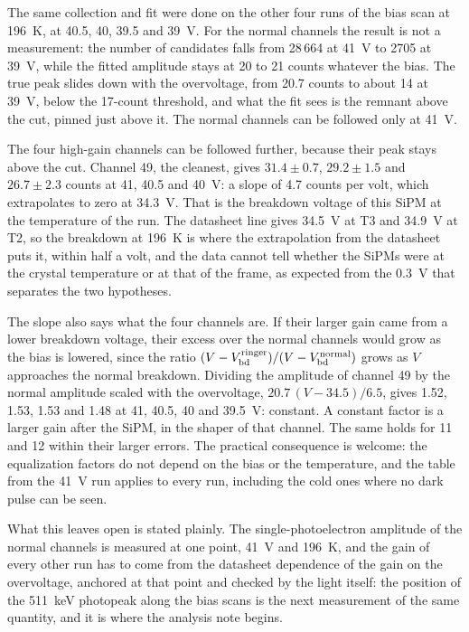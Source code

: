 \documentclass[11pt]{article}
\begin{document}
The same collection and fit were done on the other four runs of the bias
scan at 196~K, at 40.5, 40, 39.5 and 39~V. For the normal channels the
result is not a measurement: the number of candidates falls from 28\,664
at 41~V to 2705 at 39~V, while the fitted amplitude stays at 20 to 21
counts whatever the bias. The true peak slides down with the overvoltage,
from 20.7 counts to about 14 at 39~V, below the 17-count threshold, and
what the fit sees is the remnant above the cut, pinned just above it. The
normal channels can be followed only at 41~V.

The four high-gain channels can be followed further, because their peak
stays above the cut. Channel 49, the cleanest, gives $31.4 \pm 0.7$,
$29.2 \pm 1.5$ and $26.7 \pm 2.3$ counts at 41, 40.5 and 40~V: a slope of
4.7 counts per volt, which extrapolates to zero at 34.3~V. That is the
breakdown voltage of this SiPM at the temperature of the run. The datasheet
line gives 34.5~V at T3 and 34.9~V at T2, so the breakdown at 196~K is
where the extrapolation from the datasheet puts it, within half a volt,
and the data cannot tell whether the SiPMs were at the crystal temperature
or at that of the frame, as expected from the 0.3~V that separates the two
hypotheses.

The slope also says what the four channels are. If their larger gain came
from a lower breakdown voltage, their excess over the normal channels
would grow as the bias is lowered, since the ratio $(V - V_{\rm bd}^{\rm
ringer}) / (V - V_{\rm bd}^{\rm normal})$ grows as $V$ approaches the normal
breakdown. Dividing the amplitude of channel 49 by the normal amplitude
scaled with the overvoltage, $20.7\,(V - 34.5) / 6.5$, gives 1.52, 1.53,
1.53 and 1.48 at 41, 40.5, 40 and 39.5~V: constant. A constant factor is a
larger gain after the SiPM, in the shaper of that channel. The same holds
for 11 and 12 within their larger errors. The practical consequence is
welcome: the equalization factors do not depend on the bias or the
temperature, and the table from the 41~V run applies to every run,
including the cold ones where no dark pulse can be seen.

What this leaves open is stated plainly. The single-photoelectron
amplitude of the normal channels is measured at one point, 41~V and 196~K,
and the gain of every other run has to come from the datasheet dependence
of the gain on the overvoltage, anchored at that point and checked by the
light itself: the position of the 511~keV photopeak along the bias scans
is the next measurement of the same quantity, and it is where the analysis
note begins.
\end{document}
